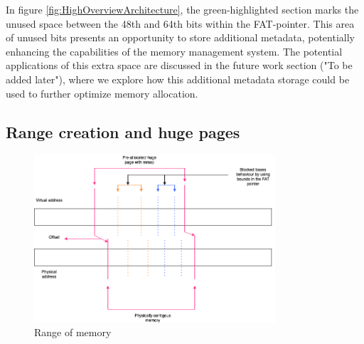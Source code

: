 \documentclass[acmsmall,screen,review]{acmart}
\begin{document}
In figure \ref{fig:HighOverviewArchitecture}, the green-highlighted section marks the unused space between the 48th and 64th bits
within the FAT-pointer. This area of unused bits presents an opportunity to store additional metadata,
potentially enhancing the capabilities of the memory management system. The potential applications of 
this extra space are discussed in the future work section ("To be added later"), 
where we explore how this additional metadata storage could be used to further optimize memory allocation.



\subsection{Range creation and huge pages}
\begin{figure}[h]
  \includegraphics[width=0.8\textwidth]{diagrams/AllocationOverview24.png}
  \caption{Range of memory}
  \label{fig:RangeOfMemory}
\end{figure}

\end{document}
